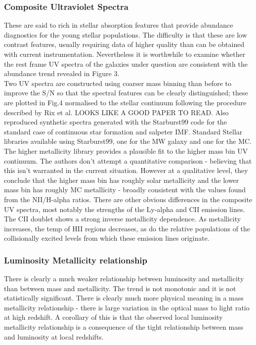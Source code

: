 \documentclass{literature}
\begin{document}
\subsubsection{Composite Ultraviolet Spectra}
These are said to rich in stellar absorption features that provide abundance diagnostics for the young stellar populations. The difficulty is that these are low contrast features, usually requiring data of higher quality than can be obtained with current instrumentation. Nevertheless it is worthwhile to examine whether the rest frame UV spectra of the galaxies under question are consistent with the abundance trend revealed in Figure 3. \\
Two UV spectra are constructed using coarser mass binning than before to improve the S/N so that the spectral features can be clearly distinguished; these are plotted in Fig.4 normalised to the stellar continuum following the procedure described by Rix et al. \citep{Rix_2004} LOOKS LIKE A GOOD PAPER TO READ. Also reproduced synthetic spectra generated with the Starburst99 code \citep{Leitherer1999} for the standard case of continuous star formation and salpeter IMF. Standard Stellar libraries available using Starburst99, one for the MW galaxy and one for the MC. The higher metallicity library provides a plausible fit to the higher mass bin UV continuum. The authors don't attempt a quantitative comparison - believing that this isn't warranted in the current situation. However at a qualitative level, they conclude that the higher mass bin has roughly solar metallicity and the lower mass bin has roughly MC metallicity - broadly consistent with the values found from the NII/H-alpha ratios. There are other obvious differences in the composite UV spectra, most notably the strengths of the Ly-alpha and CII emission lines. The CII doublet shows a strong inverse metallicity dependence. As metallicity increases, the temp of HII regions decreases, as do the relative populations of the collisionally excited levels from which these emission lines originate. 
\subsubsection{Luminosity Metallicity relationship}
There is clearly a much weaker relationship between luminosity and metallicity than between mass and metallicity. The trend is not monotonic and it is not statistically significant. There is clearly much more physical meaning in a mass metallicity relationship - there is large variation in the optical mass to light ratio at high redshift. A corollary of this is that the observed local luminosity metallicity relationship is a consequence of the tight relationship between mass and luminosity at local redshifts. 
\end{document}
